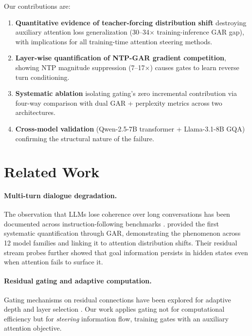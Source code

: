 \documentclass[11pt,a4paper]{article}
\begin{document}
Our contributions are:
\begin{enumerate}
    \item \textbf{Quantitative evidence of teacher-forcing distribution shift} destroying auxiliary attention loss generalization (30--34$\times$ training-inference GAR gap), with implications for all training-time attention steering methods.
    \item \textbf{Layer-wise quantification of NTP-GAR gradient competition}, showing NTP magnitude suppression (7--17$\times$) causes gates to learn reverse turn conditioning.
    \item \textbf{Systematic ablation} isolating gating's zero incremental contribution via four-way comparison with dual GAR + perplexity metrics across two architectures.
    \item \textbf{Cross-model validation} (Qwen-2.5-7B transformer + Llama-3.1-8B GQA) confirming the structural nature of the failure.
\end{enumerate}

\section{Related Work}

\paragraph{Multi-turn dialogue degradation.}
The observation that LLMs lose coherence over long conversations has been documented across instruction-following benchmarks \citep{zheng2024chatbot,li2024longcontext}.
\citet{dongre2026} provided the first systematic quantification through GAR, demonstrating the phenomenon across 12 model families and linking it to attention distribution shifts.
Their residual stream probes further showed that goal information persists in hidden states even when attention fails to surface it.

\paragraph{Residual gating and adaptive computation.}
Gating mechanisms on residual connections have been explored for adaptive depth \citep{raposo2024mixture,fan2020reducing} and layer selection \citep{elbayad2020depth}.
Our work applies gating not for computational efficiency but for \emph{steering} information flow, training gates with an auxiliary attention objective.
\end{document}
